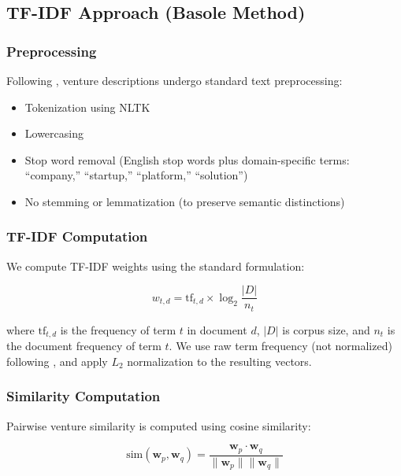 \documentclass[../main.tex]{subfiles}
\begin{document}
\subsection{TF-IDF Approach (Basole Method)}

\subsubsection{Preprocessing}

Following \cite{basole2019visual}, venture descriptions undergo standard text preprocessing:
\begin{itemize}
    \item Tokenization using NLTK
    \item Lowercasing
    \item Stop word removal (English stop words plus domain-specific terms: ``company,'' ``startup,'' ``platform,'' ``solution'')
    \item No stemming or lemmatization (to preserve semantic distinctions)
\end{itemize}

\subsubsection{TF-IDF Computation}

We compute TF-IDF weights using the standard formulation:

\begin{equation}
    w_{t,d} = \text{tf}_{t,d} \times \log_2 \frac{|D|}{n_t}
\end{equation}

where $\text{tf}_{t,d}$ is the frequency of term $t$ in document $d$, $|D|$ is corpus size, and $n_t$ is the document frequency of term $t$. We use raw term frequency (not normalized) following \cite{basole2019visual}, and apply $L_2$ normalization to the resulting vectors.

\subsubsection{Similarity Computation}

Pairwise venture similarity is computed using cosine similarity:

\begin{equation}
    \text{sim}(\mathbf{w}_p, \mathbf{w}_q) = \frac{\mathbf{w}_p \cdot \mathbf{w}_q}{\|\mathbf{w}_p\| \|\mathbf{w}_q\|}
\end{equation}
\end{document}
